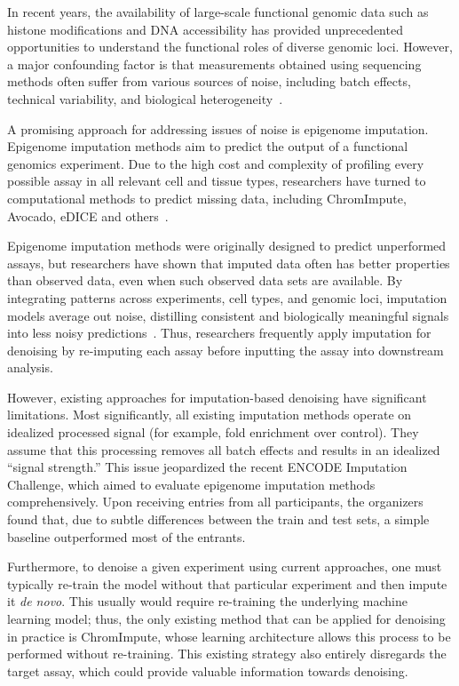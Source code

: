 
In recent years, the availability of large-scale functional genomic data such as histone modifications and DNA accessibility has provided unprecedented opportunities to understand the functional roles of diverse genomic loci. However, a major confounding factor is that measurements obtained using sequencing methods often suffer from various sources of noise, including batch effects, technical variability, and biological heterogeneity~\cite{zhang2008model, xiang2020s3norm, schreiber2023encode, shahraki2024robust, landt2012chip, teng2021characterizing}.

A promising approach for addressing issues of noise is epigenome imputation. Epigenome imputation methods aim to predict the output of a functional genomics experiment. Due to the high cost and complexity of profiling every possible assay in all relevant cell and tissue types, researchers have turned to computational methods to predict missing data, including ChromImpute, Avocado, eDICE and others~\cite{ernst2015large, schreiber2020avocado, schreiber2023encode, durham2018predictd, hawkins2023getting}.

Epigenome imputation methods were originally designed to predict unperformed assays, but researchers have shown that imputed data often has better properties than observed data, even when such observed data sets are available. By integrating patterns across experiments, cell types, and genomic loci, imputation models average out noise, distilling consistent and biologically meaningful signals into less noisy predictions~\cite{ernst2015large}. Thus, researchers frequently apply imputation for denoising by re-imputing each assay before inputting the assay into downstream analysis.

However, existing approaches for imputation-based denoising have significant limitations. Most significantly, all existing imputation methods operate on idealized processed signal (for example, fold enrichment over control). They assume that this processing removes all batch effects and results in an idealized ``signal strength.'' This issue jeopardized the recent ENCODE Imputation Challenge, which aimed to evaluate epigenome imputation methods comprehensively. Upon receiving entries from all participants, the organizers found that, due to subtle differences between the train and test sets, a simple baseline outperformed most of the entrants.

Furthermore, to denoise a given experiment using current approaches, one must typically re-train the model without that particular experiment and then impute it \emph{de novo}. This usually would require re-training the underlying machine learning model; thus, the only existing method that can be applied for denoising in practice is ChromImpute, whose learning architecture allows this process to be performed without re-training. This existing strategy also entirely disregards the target assay, which could provide valuable information towards denoising.

